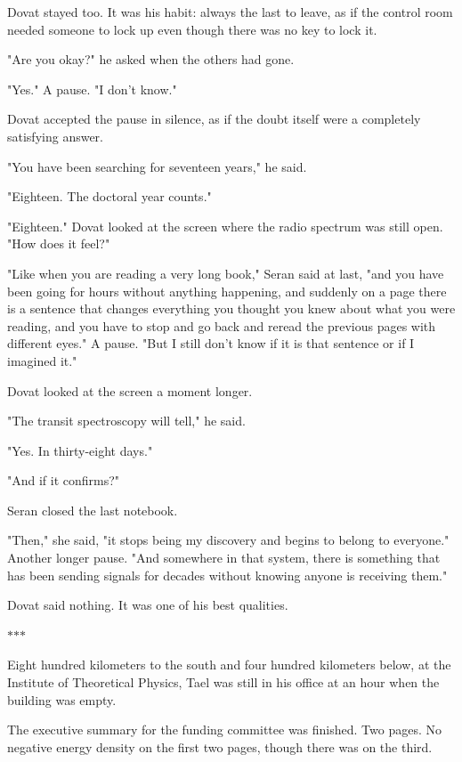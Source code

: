 \documentclass[11pt,a5paper,twoside]{book}
\begin{document}
Dovat stayed too. It was his habit: always the last to leave, as if the control room needed someone to lock up even though there was no key to lock it.

"Are you okay?" he asked when the others had gone.

"Yes." A pause. "I don't know."

Dovat accepted the pause in silence, as if the doubt itself were a completely satisfying answer.

"You have been searching for seventeen years," he said.

"Eighteen. The doctoral year counts."

"Eighteen." Dovat looked at the screen where the radio spectrum was still open. "How does it feel?"

"Like when you are reading a very long book," Seran said at last, "and you have been going for hours without anything happening, and suddenly on a page there is a sentence that changes everything you thought you knew about what you were reading, and you have to stop and go back and reread the previous pages with different eyes." A pause. "But I still don't know if it is that sentence or if I imagined it."

Dovat looked at the screen a moment longer.

"The transit spectroscopy will tell," he said.

"Yes. In thirty-eight days."

"And if it confirms?"

Seran closed the last notebook.

"Then," she said, "it stops being my discovery and begins to belong to everyone." Another longer pause. "And somewhere in that system, there is something that has been sending signals for decades without knowing anyone is receiving them."

Dovat said nothing. It was one of his best qualities.

\vspace{1.5em}
\begin{center}$\ast$\quad$\ast$\quad$\ast$\end{center}
\vspace{1.5em}

Eight hundred kilometers to the south and four hundred kilometers below, at the Institute of Theoretical Physics, Tael was still in his office at an hour when the building was empty.

The executive summary for the funding committee was finished. Two pages. No negative energy density on the first two pages, though there was on the third.
\end{document}

